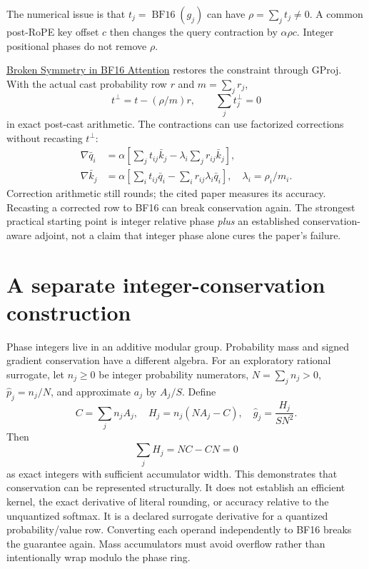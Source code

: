 \documentclass[11pt]{article}
\begin{document}
The numerical issue is that $t_j=\operatorname{BF16}(g_j)$ can have $\rho=\sum_jt_j\ne0$. A common post-RoPE key offset $c$ then changes the query contraction by $\alpha\rho c$. Integer positional phases do not remove $\rho$.

\href{https://arxiv.org/html/2609.34272v1}{Broken Symmetry in BF16 Attention} restores the constraint through GProj. With the actual cast probability row $r$ and $m=\sum_jr_j$,
\begin{equation}
 t^\perp=t-(\rho/m)r,\qquad\sum_jt_j^\perp=0
\end{equation}
in exact post-cast arithmetic. The contractions can use factorized corrections without recasting $t^\perp$:
\begin{align}
 \nabla\bar q_i&=\alpha\left[\sum_jt_{ij}\bar k_j-
 \lambda_i\sum_jr_{ij}\bar k_j\right],\\
 \nabla\bar k_j&=\alpha\left[\sum_it_{ij}\bar q_i-
 \sum_i r_{ij}\lambda_i\bar q_i\right],\quad\lambda_i=\rho_i/m_i.
\end{align}
Correction arithmetic still rounds; the cited paper measures its accuracy. Recasting a corrected row to BF16 can break conservation again. The strongest practical starting point is integer relative phase \emph{plus} an established conservation-aware adjoint, not a claim that integer phase alone cures the paper's failure.

\section{A separate integer-conservation construction}

Phase integers live in an additive modular group. Probability mass and signed gradient conservation have a different algebra. For an exploratory rational surrogate, let $n_j\geq0$ be integer probability numerators, $N=\sum_jn_j>0$, $\widehat p_j=n_j/N$, and approximate $a_j$ by $A_j/S$. Define
\begin{equation}
 C=\sum_jn_jA_j,\quad H_j=n_j(NA_j-C),\quad
 \widehat g_j=\frac{H_j}{SN^2}.
\end{equation}
Then
\begin{equation}
 \sum_jH_j=NC-CN=0
\end{equation}
as exact integers with sufficient accumulator width. This demonstrates that conservation can be represented structurally. It does not establish an efficient kernel, the exact derivative of literal rounding, or accuracy relative to the unquantized softmax. It is a declared surrogate derivative for a quantized probability/value row. Converting each operand independently to BF16 breaks the guarantee again. Mass accumulators must avoid overflow rather than intentionally wrap modulo the phase ring.
\end{document}
